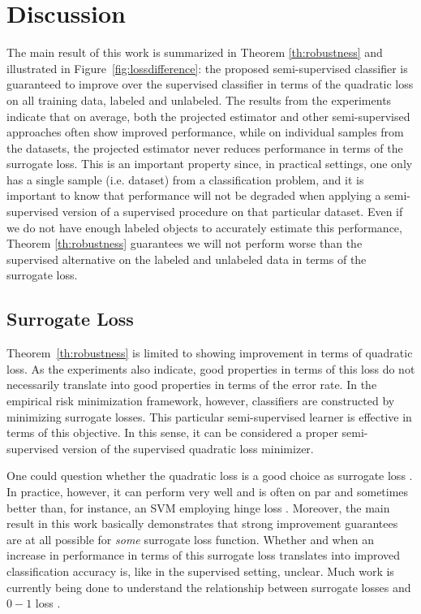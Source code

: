 \documentclass[smallcondensed]{svjour3}\usepackage[]{graphicx}\usepackage[]{color}
\begin{document}
\section{Discussion}
The main result of this work is summarized in Theorem \ref{th:robustness} and illustrated in Figure~\ref{fig:lossdifference}: the proposed semi-supervised classifier is guaranteed to improve over the supervised classifier in terms of the quadratic loss on all training data, labeled and unlabeled. The results from the experiments indicate that on average, both the projected estimator and other semi-supervised approaches often show improved performance, while on individual samples from the datasets, the projected estimator never reduces performance in terms of the surrogate loss. This is an important property since, in practical settings, one only has a single sample (i.e. dataset) from a classification problem, and it is important to know that performance will not be degraded when applying a semi-supervised version of a supervised procedure on that particular dataset. Even if we do not have enough labeled objects to accurately estimate this performance, Theorem \ref{th:robustness} guarantees we will not perform worse than the supervised alternative on the labeled and unlabeled data in terms of the surrogate loss. 

\subsection{Surrogate Loss}
Theorem~\ref{th:robustness} is limited to showing improvement in terms of quadratic loss. As the experiments also indicate, good properties in terms of this loss do not necessarily translate into good properties in terms of the error rate. In the empirical risk minimization framework, however, classifiers are constructed by minimizing surrogate losses. This particular semi-supervised learner is effective in terms of this objective. In this sense, it can be considered a proper semi-supervised version of the supervised quadratic loss minimizer.

One could question whether the quadratic loss is a good choice as surrogate loss \citep{Ben-David2012}. In practice, however, it can perform very well and is often on par and sometimes better than, for instance, an SVM employing hinge loss \citep{Rasmussen2005,Hastie2009,Poggio2003}. Moreover, the main result in this work basically demonstrates that strong improvement guarantees are at all possible for \emph{some} surrogate loss function. Whether and when an increase in performance in terms of this surrogate loss translates into improved classification accuracy is, like in the supervised setting, unclear. Much work is currently being done to understand the relationship between surrogate losses and ${0}-{1}$ loss \citep{Bartlett2006, Ben-David2012}. 
\end{document}
